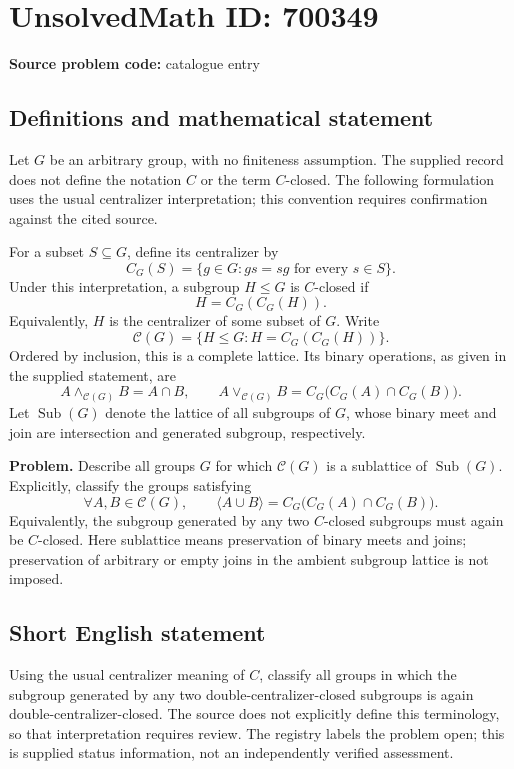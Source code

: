 \documentclass[11pt]{article}
\begin{document}
\section*{UnsolvedMath ID: 700349}
\textbf{Source problem code:} catalogue entry
\subsection{Definitions and mathematical statement}
Let \(G\) be an arbitrary group, with no finiteness assumption. The supplied record does not define the notation \(C\) or the term \(C\)-closed. The following formulation uses the usual centralizer interpretation; this convention requires confirmation against the cited source.

For a subset \(S\subseteq G\), define its centralizer by
\[
C_G(S)=\{g\in G:gs=sg\text{ for every }s\in S\}.
\]
Under this interpretation, a subgroup \(H\leq G\) is \(C\)-closed if
\[
H=C_G(C_G(H)).
\]
Equivalently, \(H\) is the centralizer of some subset of \(G\). Write
\[
\mathcal C(G)=\{H\leq G:H=C_G(C_G(H))\}.
\]
Ordered by inclusion, this is a complete lattice. Its binary operations, as given in the supplied statement, are
\[
A\wedge_{\mathcal C(G)}B=A\cap B,
\qquad
A\vee_{\mathcal C(G)}B=C_G\bigl(C_G(A)\cap C_G(B)\bigr).
\]
Let \(\operatorname{Sub}(G)\) denote the lattice of all subgroups of \(G\), whose binary meet and join are intersection and generated subgroup, respectively.

\textbf{Problem.} Describe all groups \(G\) for which \(\mathcal C(G)\) is a sublattice of \(\operatorname{Sub}(G)\). Explicitly, classify the groups satisfying
\[
\forall A,B\in\mathcal C(G),\qquad
\langle A\cup B\rangle
=C_G\bigl(C_G(A)\cap C_G(B)\bigr).
\]
Equivalently, the subgroup generated by any two \(C\)-closed subgroups must again be \(C\)-closed. Here sublattice means preservation of binary meets and joins; preservation of arbitrary or empty joins in the ambient subgroup lattice is not imposed.
\subsection{Short English statement}
Using the usual centralizer meaning of \(C\), classify all groups in which the subgroup generated by any two double-centralizer-closed subgroups is again double-centralizer-closed. The source does not explicitly define this terminology, so that interpretation requires review. The registry labels the problem open; this is supplied status information, not an independently verified assessment.
\end{document}
